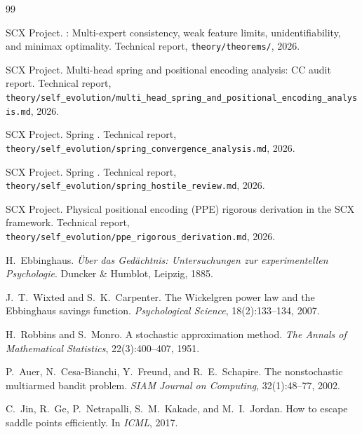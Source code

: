 \documentclass[11pt,a4paper]{article}
\theoremstyle{remark}
\begin{document}
\begin{thebibliography}{99}

SCX Project.
: Multi-expert consistency, weak feature limits,
  unidentifiability, and minimax optimality.
\newblock Technical report, \texttt{theory/theorems/}, 2026.

SCX Project.
\newblock Multi-head spring and positional encoding analysis: {CC} audit report.
\newblock Technical report,
  \texttt{theory/self\_evolution/multi\_head\_spring\_and\_positional\_encoding\_analysis.md},
  2026.

SCX Project.
\newblock Spring .
\newblock Technical report,
  \texttt{theory/self\_evolution/spring\_convergence\_analysis.md}, 2026.

SCX Project.
\newblock Spring .
\newblock Technical report,
  \texttt{theory/self\_evolution/spring\_hostile\_review.md}, 2026.

SCX Project.
\newblock Physical positional encoding ({PPE}) rigorous derivation in the {SCX}
  framework.
\newblock Technical report,
  \texttt{theory/self\_evolution/ppe\_rigorous\_derivation.md}, 2026.

H.~Ebbinghaus.
\newblock \emph{\"{U}ber das Ged\"{a}chtnis: Untersuchungen zur experimentellen
  Psychologie}.
\newblock Duncker \& Humblot, Leipzig, 1885.

J.~T.~Wixted and S.~K.~Carpenter.
\newblock The Wickelgren power law and the Ebbinghaus savings function.
\newblock \emph{Psychological Science}, 18(2):133--134, 2007.

H.~Robbins and S.~Monro.
\newblock A stochastic approximation method.
\newblock \emph{The Annals of Mathematical Statistics}, 22(3):400--407, 1951.

P.~Auer, N.~Cesa-Bianchi, Y.~Freund, and R.~E.~Schapire.
\newblock The nonstochastic multiarmed bandit problem.
\newblock \emph{SIAM Journal on Computing}, 32(1):48--77, 2002.

C.~Jin, R.~Ge, P.~Netrapalli, S.~M.~Kakade, and M.~I.~Jordan.
\newblock How to escape saddle points efficiently.
\newblock In \emph{ICML}, 2017.


\end{thebibliography}
\end{document}
